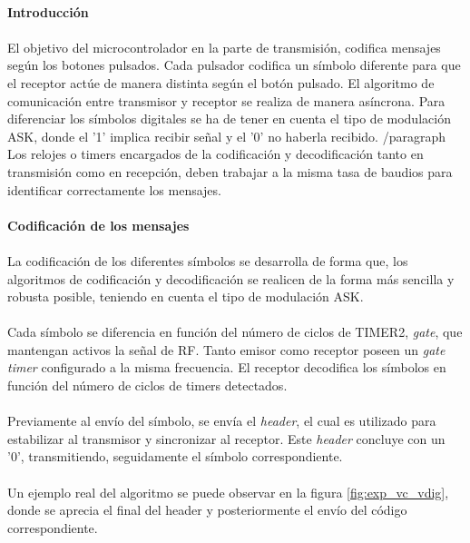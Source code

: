 \paragraph{Introducción} 
\paragraph{}
El objetivo del microcontrolador en la parte de transmisión, codifica mensajes según los botones pulsados.
Cada pulsador codifica un símbolo diferente para que el receptor actúe de manera distinta según el botón pulsado. El algoritmo de comunicación entre transmisor y receptor se realiza de manera asíncrona. Para diferenciar los símbolos digitales se ha de tener en cuenta el tipo de modulación ASK, donde el '1' implica recibir señal y el '0' no haberla recibido. 
/paragraph{}
Los relojes o timers encargados de la codificación y decodificación tanto en transmisión como en recepción, deben trabajar a la misma tasa de baudios para identificar correctamente los mensajes.

\paragraph{Codificaci\'on de los mensajes} 
\paragraph{}
La codificación de los diferentes símbolos se desarrolla de forma que, los algoritmos de codificación y decodificación se realicen de la forma más sencilla y robusta posible, teniendo en cuenta el tipo de modulación ASK.
\paragraph{}
Cada s\'imbolo se diferencia en funci\'on del n\'umero de ciclos de TIMER2, \textit{gate}, que mantengan activos la señal de RF.
Tanto emisor como receptor poseen un \textit{gate timer} configurado a la misma frecuencia. El receptor decodifica los s\'imbolos en función del número de ciclos de timers detectados. 
\paragraph{}
Previamente al envío del símbolo, se envía el \textit{header}, el cual es utilizado para estabilizar al transmisor y sincronizar al receptor. Este \textit{header} concluye con un '0', transmitiendo, seguidamente el s\'imbolo correspondiente.
\paragraph{}
Un ejemplo real del algoritmo se puede observar en la figura \ref{fig:exp_vc_vdig}, donde se aprecia el final del header y posteriormente el env\'io del c\'odigo correspondiente.

